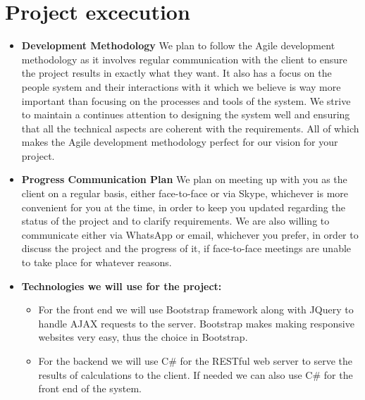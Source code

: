\documentclass{article}
\begin{document}
	\section{Project excecution}
	\begin{itemize}
		\item \textbf{Development Methodology} \newline \newline
		We plan to follow the Agile development methodology as it involves regular communication with the client to ensure the project results in exactly what they want. It also has a focus on the people system and their interactions with it which we believe is way more important than focusing on the processes and tools of the system. We strive to maintain a continues attention to designing the system well and ensuring that all the technical aspects are coherent with the requirements. All of which makes the Agile development methodology perfect for our vision for your project.
		
		\item \textbf{Progress Communication Plan} \newline \newline
		We plan on meeting up with you as the client on a regular basis, either face-to-face or via Skype, whichever is more convenient for you at the time, in order to keep you updated regarding the status of the project and to clarify requirements. We are also willing to communicate either via WhatsApp or email, whichever you prefer, in order to discuss the project and the progress of it, if face-to-face meetings are unable to take place for whatever reasons.

		\item \textbf{Technologies we will use for the project:}
		\begin{itemize}
			\item For the front end we will use Bootstrap framework along with JQuery to handle AJAX requests to the server. Bootstrap makes making responsive websites very easy, thus the choice in Bootstrap.
			\item For the backend we will use C\# for the RESTful web server to serve the results of calculations to the client. If needed we can also use C\# for the front end of the system.	
		\end{itemize}
	\end{itemize}
\end{document}
